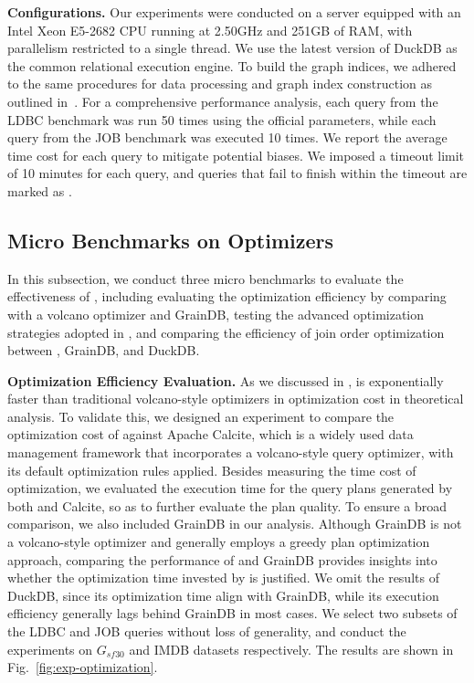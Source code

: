 \noindent\textbf{Configurations. }
Our experiments were conducted on a server equipped with an Intel Xeon E5-2682 CPU running at 2.50GHz and 251GB of RAM, with parallelism restricted to a single thread.
We use the latest version of DuckDB as the common relational execution engine.
To build the graph indices, we adhered to the same procedures for data processing and graph index construction as outlined in~\cite{graindb}.
For a comprehensive performance analysis, each query from the LDBC benchmark was run 50 times using the official parameters, while each query from the JOB benchmark was executed 10 times. We report the average time cost for each query to mitigate potential biases.
We imposed a timeout limit of 10 minutes for each query, and queries that fail to finish within the timeout are marked as \ot.

\subsection{Micro Benchmarks on Optimizers}
\label{sec:experiment-opt}
In this subsection, we conduct three micro benchmarks to evaluate the effectiveness of \name, 
including evaluating the optimization efficiency by comparing \name with a volcano optimizer and GrainDB, testing the advanced optimization strategies adopted in \name, and comparing the efficiency of join order optimization between \name, GrainDB, and DuckDB.

\noindent\textbf{Optimization Efficiency Evaluation.}
As we discussed in , \name is exponentially faster than traditional volcano-style optimizers in optimization cost in theoretical analysis.
To validate this, we designed an experiment to compare the optimization cost of \name against Apache Calcite, which is a widely used data management framework that incorporates a volcano-style query optimizer, with its default optimization rules applied.
Besides measuring the time cost of optimization, we evaluated the execution time for the query plans generated by both \name and Calcite, so as to further evaluate the plan quality.
To ensure a broad comparison, we also included GrainDB in our analysis. Although GrainDB is not a volcano-style optimizer and generally employs a greedy plan optimization approach,
comparing the performance of \name and GrainDB provides insights into whether the optimization time invested by \name is justified.
We omit the results of DuckDB, since its optimization time align with GrainDB, while its execution efficiency generally lags behind GrainDB in most cases.
We select two subsets of the LDBC and JOB queries without loss of generality, and conduct the experiments on $G_{sf30}$ and IMDB datasets respectively.
The results are shown in Fig.~\ref{fig:exp-optimization}.

